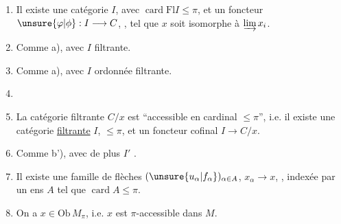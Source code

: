 \begin{enumerate}[label={},leftmargin=2em]
\item[a)] Il existe une catégorie $I$, avec $\operatorname{card}\mathrm{Fl}I\leq\pi$, et un foncteur $\unsure{\varphi|\phi}:I\longrightarrow C$, , tel que $x$ soit isomorphe à $\varinjlim x_i$.
\item[a')] Comme a), avec $I$ filtrante.
\item[a'')] Comme a), avec $I$ ordonnée filtrante.
\item[b)] 
\item[b')] La catégorie filtrante $C/x$ est ``accessible en cardinal $\leq\pi$'', i.e. il existe une catégorie  \uline{filtrante} $I$,   $\leq\pi$, et un foncteur cofinal $I\longrightarrow C/x$.
\item[b'')] Comme b'), avec de plus $I'$ .
\item[c)] Il existe une famille de flèches $(\unsure{u_\alpha|f_\alpha})_{\alpha\in A}$, $x_\alpha\longrightarrow x$, , indexée par un ens $A$ tel que $\operatorname{card}A\leq\pi$.
\item[d)] On a $x\in\mathrm{Ob}\,M_\pi$, i.e. $x$ est $\pi$-accessible dans $M$.
\end{enumerate}

